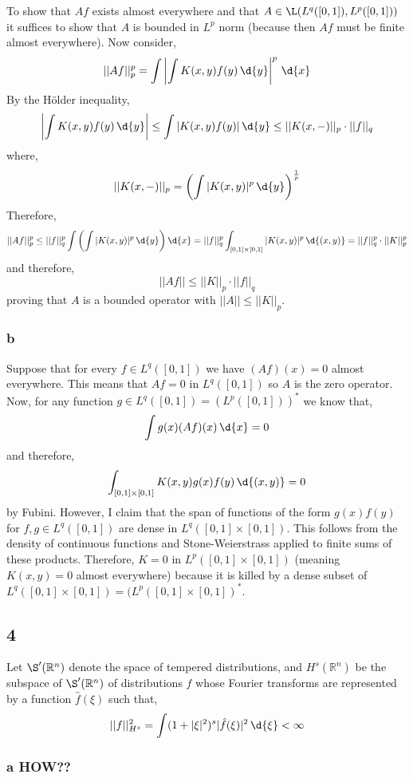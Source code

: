 \documentclass[12pt]{article}
\newcommand{\R}{\mathbb{R}}
\begin{document}
To show that $A f$ exists almost everywhere and that $A \in \L(L^q([0, 1]), L^p([0,1]))$ it suffices to show that $A$ is bounded in $L^p$ norm (because then $A f$ must be finite almost everywhere). Now consider,
\[ || A f ||_p^p = \int \left| \int K(x, y) f(y) \, \d{y} \right|^p \, \d{x} \]
By the H\"{o}lder inequality,
\[ \left| \int K(x, y) f(y) \, \d{y} \right| \le \int | K(x,y) f(y) | \, \d{y} \le || K(x, -) ||_p \cdot || f ||_q \]
where,
\[ || K(x, -) ||_p = \left( \int |K(x,y)|^p \, \d{y} \right)^{\frac{1}{p}} \]
Therefore, 
\[ || A f ||_p^p \le || f ||_q^p \int \left(  \int |K(x,y)|^p \, \d{y} \right) \d{x} = || f ||_q^p \int_{[0,1] \times [0,1]} |K(x,y)|^p \, \d{(x,y)} = || f ||_q^p \cdot || K ||_p^p \]
and therefore,
\[ || A f || \le || K ||_p \cdot || f ||_q \]
proving that $A$ is a bounded operator with $|| A || \le || K ||_p$.

\subsubsection{b}

Suppose that for every $f \in L^q([0,1])$ we have $(A f)(x) = 0$ almost everywhere. This means that $A f = 0$ in $L^q([0,1])$ so $A$ is the zero operator. Now, for any function $g \in L^q([0,1]) = (L^p([0, 1]))^*$ we know that,
\[ \int g(x) (A f)(x) \, \d{x} = 0 \]
and therefore,
\[ \int_{[0, 1] \times [0,1]} K(x,y) g(x) f(y) \, \d{(x, y)} = 0 \]
by Fubini. However, I claim that the span of functions of the form $g(x) f(y)$ for $f,g \in L^q([0,1])$ are dense in $L^q([0,1] \times [0,1])$. This follows from the density of continuous functions and Stone-Weierstrass applied to finite sums of these products. Therefore, $K = 0$ in $L^p([0,1] \times [0,1])$ (meaning $K(x,y) = 0$ almost everywhere) because it is killed by a dense subset of $L^q([0,1] \times [0,1]) = (L^p([0,1] \times [0,1])^*$.

\subsection{4}

Let $\S'(\R^n)$ denote the space of tempered distributions, and $H^s(\R^n)$ be the subspace of $\S'(\R^n)$ of distributions $f$ whose Fourier transforms are represented by a function $\hat{f}(\xi)$ such that,
\[ || f ||_{H^s}^2 = \int (1 + | \xi|^2)^s | \hat{f}(\xi)|^2 \, \d{\xi} < \infty \]

\subsubsection{a HOW??}
\end{document}

